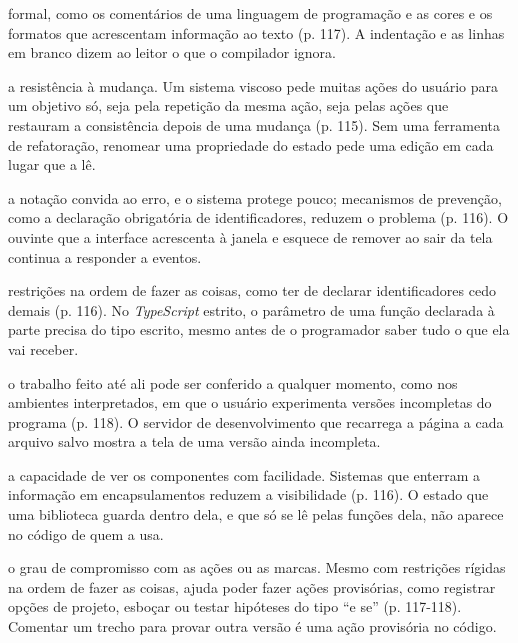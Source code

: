 \begin{description}
formal, como os comentários de uma linguagem de programação e as cores
e os formatos que acrescentam informação ao texto (p. 117). A
indentação e as linhas em branco dizem ao leitor o que o compilador
ignora.
\item[{Viscosidade:}] a resistência à mudança. Um sistema viscoso pede
muitas ações do usuário para um objetivo só, seja pela repetição da
mesma ação, seja pelas ações que restauram a consistência depois de
uma mudança (p. 115). Sem uma ferramenta de refatoração, renomear uma
propriedade do estado pede uma edição em cada lugar que a lê.
\item[{Propensão a erros:}] a notação convida ao erro, e o sistema protege
pouco; mecanismos de prevenção, como a declaração obrigatória de
identificadores, reduzem o problema (p. 116). O ouvinte que a
interface acrescenta à janela e esquece de remover ao sair da tela
continua a responder a eventos.
\item[{Compromisso prematuro:}] restrições na ordem de fazer as coisas,
como ter de declarar identificadores cedo demais (p. 116). No
\emph{TypeScript} estrito, o parâmetro de uma função declarada à parte
precisa do tipo escrito, mesmo antes de o programador saber tudo o que
ela vai receber.
\item[{Avaliação progressiva:}] o trabalho feito até ali pode ser conferido
a qualquer momento, como nos ambientes interpretados, em que o usuário
experimenta versões incompletas do programa (p. 118). O servidor de
desenvolvimento que recarrega a página a cada arquivo salvo mostra a
tela de uma versão ainda incompleta.
\item[{Visibilidade:}] a capacidade de ver os componentes com facilidade.
Sistemas que enterram a informação em encapsulamentos reduzem a
visibilidade (p. 116). O estado que uma biblioteca guarda dentro dela,
e que só se lê pelas funções dela, não aparece no código de quem a
usa.
\item[{Provisoriedade:}] o grau de compromisso com as ações ou as marcas.
Mesmo com restrições rígidas na ordem de fazer as coisas, ajuda poder
fazer ações provisórias, como registrar opções de projeto, esboçar ou
testar hipóteses do tipo “e se” (p. 117-118). Comentar um
trecho para provar outra versão é uma ação provisória no código.
\end{description}
